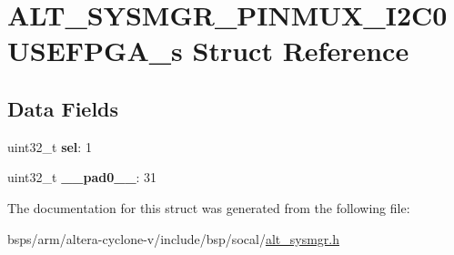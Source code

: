 \hypertarget{structALT__SYSMGR__PINMUX__I2C0USEFPGA__s}{}\section{A\+L\+T\+\_\+\+S\+Y\+S\+M\+G\+R\+\_\+\+P\+I\+N\+M\+U\+X\+\_\+\+I2\+C0\+U\+S\+E\+F\+P\+G\+A\+\_\+s Struct Reference}
\label{structALT__SYSMGR__PINMUX__I2C0USEFPGA__s}
\subsection*{Data Fields}
\begin{DoxyCompactItemize}
\item 
\mbox{\label{structALT__SYSMGR__PINMUX__I2C0USEFPGA__s_af9fdd54d8ca651a99e76e51d989b0f5c}} 
uint32\+\_\+t {\bfseries sel}\+: 1
\item 
\mbox{\label{structALT__SYSMGR__PINMUX__I2C0USEFPGA__s_a5799621914d3db4f5b31a7ebb255cdf3}} 
uint32\+\_\+t {\bfseries \+\_\+\+\_\+pad0\+\_\+\+\_\+}\+: 31
\end{DoxyCompactItemize}


The documentation for this struct was generated from the following file\+:\begin{DoxyCompactItemize}
\item 
bsps/arm/altera-\/cyclone-\/v/include/bsp/socal/\mbox{\hyperlink{alt__sysmgr_8h}{alt\+\_\+sysmgr.\+h}}\end{DoxyCompactItemize}
